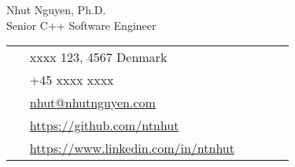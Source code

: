 \documentclass[11pt]{article} %
\begin{document}
\begin{paracol}{2}


\parbox[top][0.12\textheight][c]{\linewidth}{ %
	\vspace{-0.04\textheight} %
	\centering %
	{\sffamily\Huge Nhut Nguyen, Ph.D.}\\\medskip %
    \centering
    {\sffamily Senior C++ Software Engineer}
}

\switchcolumn %

\parbox[top][0.12\textheight][c]{\linewidth}{ %
	\vspace{-0.04\textheight} %
	\colorbox{shade}{ %
		\begin{supertabular}{p{0.05\linewidth}|p{0.775\linewidth}} %
			\raisebox{-1pt}{\faHome} & xxxx 123, 4567 Denmark  \\ %
			\raisebox{-1pt}{\faPhone} & +45 xxxx xxxx \\ %
			\raisebox{0pt}{\small\faEnvelope} & \href{mailto:nhut@nhutnguyen.com}{nhut@nhutnguyen.com} \\ %
			\raisebox{-1pt}{\faGithub} & \href{https://github.com/ntnhut}{https://github.com/ntnhut} \\ %
			\raisebox{-1pt}{\faLinkedinSquare} & \href{https://www.linkedin.com/in/ntnhut}{https://www.linkedin.com/in/ntnhut} \\ %
		\end{supertabular}
	}
}


\end{paracol}
\end{document}
